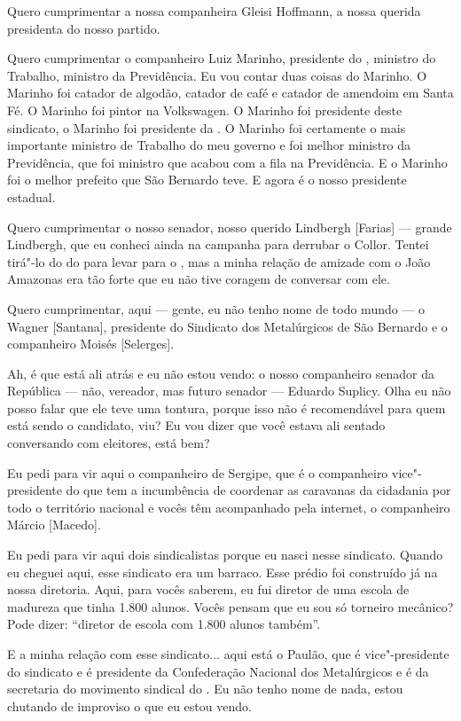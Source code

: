 Quero cumprimentar a nossa companheira Gleisi Hoffmann, a nossa
querida presidenta do nosso partido.

Quero cumprimentar o companheiro Luiz Marinho, presidente do ,
ministro do Trabalho, ministro da Previdência. Eu vou contar duas coisas
do Marinho. O Marinho foi catador de algodão, catador de café e catador
de amendoim em Santa Fé. O Marinho foi pintor na Volkswagen. O Marinho
foi presidente deste sindicato, o Marinho foi presidente da . O
Marinho foi certamente o mais importante ministro de Trabalho do meu
governo e foi melhor ministro da Previdência, que foi ministro que
acabou com a fila na Previdência. E o Marinho foi o melhor prefeito que
São Bernardo teve. E agora é o nosso presidente estadual.

Quero cumprimentar o nosso senador, nosso querido Lindbergh
[Farias] --- grande Lindbergh, que eu conheci ainda na campanha
para derrubar o Collor. Tentei tirá"-lo do do para levar para o ,
mas a minha relação de amizade com o João Amazonas era tão forte que eu
não tive coragem de conversar com ele.

Quero cumprimentar, aqui --- gente, eu não tenho nome de todo
mundo --- o Wagner [Santana], presidente do
Sindicato dos Metalúrgicos de São Bernardo e o companheiro Moisés
[Selerges].

Ah, é que está ali atrás e eu não estou vendo: o nosso companheiro
senador da República --- não, vereador, mas futuro senador --- Eduardo
Suplicy. Olha eu não posso falar que ele teve uma tontura, porque isso
não é recomendável para quem está sendo o candidato, viu? Eu vou dizer
que você estava ali sentado conversando com eleitores, está bem?

Eu pedi para vir aqui o companheiro de Sergipe, que é o
companheiro vice"-presidente do  que tem a incumbência de coordenar as
caravanas da cidadania por todo o território nacional e vocês têm
acompanhado pela internet, o companheiro Márcio [Macedo].

Eu pedi para vir aqui dois sindicalistas porque eu nasci nesse
sindicato. Quando eu cheguei aqui, esse sindicato era um barraco. Esse
prédio foi construído já na nossa diretoria. Aqui, para vocês saberem,
eu fui diretor de uma escola de madureza que tinha 1.800 alunos. Vocês
pensam que eu sou só torneiro mecânico? Pode dizer: ``diretor de escola
com 1.800 alunos também''.

E a minha relação com esse sindicato... aqui está o Paulão, que é
vice"-presidente do sindicato e é presidente da Confederação Nacional dos
Metalúrgicos e é da secretaria do movimento sindical do . Eu não tenho
nome de nada, estou chutando de improviso o que eu estou vendo.

